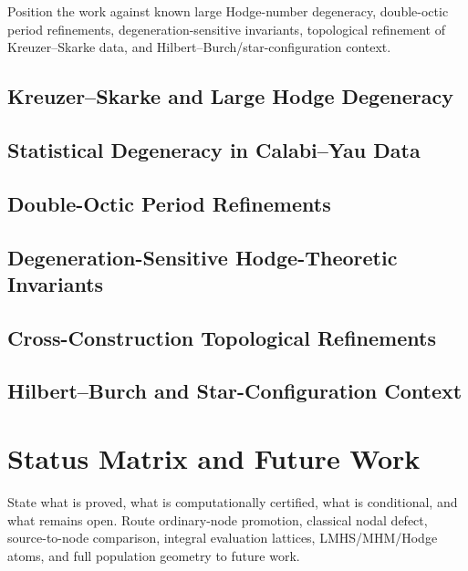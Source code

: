 
Position the work against known large Hodge-number degeneracy, double-octic
period refinements, degeneration-sensitive invariants, topological refinement
of Kreuzer--Skarke data, and Hilbert--Burch/star-configuration context.

\subsection{Kreuzer--Skarke and Large Hodge Degeneracy}

\subsection{Statistical Degeneracy in Calabi--Yau Data}

\subsection{Double-Octic Period Refinements}

\subsection{Degeneration-Sensitive Hodge-Theoretic Invariants}

\subsection{Cross-Construction Topological Refinements}

\subsection{Hilbert--Burch and Star-Configuration Context}

\section{Status Matrix and Future Work}\label{sec:status-future}


State what is proved, what is computationally certified, what is conditional,
and what remains open.  Route ordinary-node promotion, classical nodal defect,
source-to-node comparison, integral evaluation lattices, LMHS/MHM/Hodge atoms,
and full population geometry to future work.

